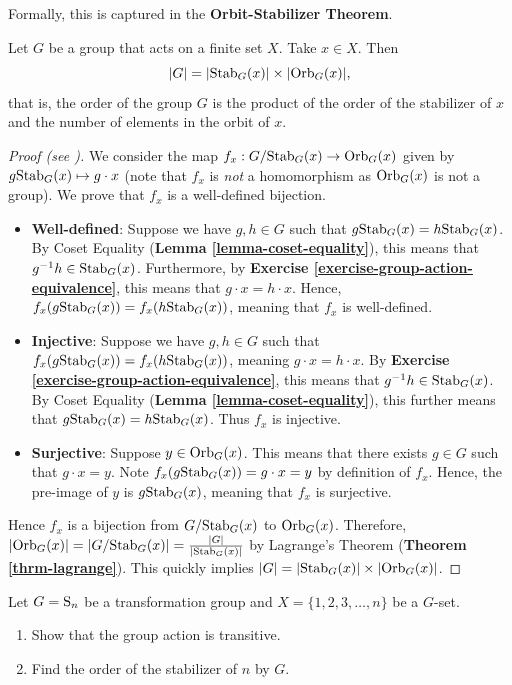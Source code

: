Formally, this is captured in the \textbf{Orbit-Stabilizer Theorem}.
\begin{theorem}\label{thrm-orbit-stabilizer}
    Let $G$ be a group that acts on a finite set $X$. Take $x \in X$. Then
    \[
        |G| = |\mathrm{Stab}_{G}(x)| \times |\mathrm{Orb}_{G}(x)|,
    \]
    that is, the order of the group $G$ is the product of the order of the stabilizer of $x$ and the number of elements in the orbit of $x$.
\end{theorem}



\begin{proof}[Proof (see \cite{humphreys_1996})]
    We consider the map $f_x: G/\mathrm{Stab}_{G}(x) \to \mathrm{Orb}_{G}(x)$ given by $g\mathrm{Stab}_{G}(x) \mapsto g \cdot x$ (note that $f_x$ is \textit{not} a homomorphism as $\mathrm{Orb}_{G}(x)$ is not a group). We prove that $f_x$ is a well-defined bijection.
    \begin{itemize}
        \item \textbf{Well-defined}: Suppose we have $g, h \in G$ such that $g\mathrm{Stab}_{G}(x) = h\mathrm{Stab}_{G}(x)$. By Coset Equality (\textbf{Lemma \ref{lemma-coset-equality}}), this means that $g^{-1}h \in \mathrm{Stab}_{G}(x)$. Furthermore, by \textbf{Exercise \ref{exercise-group-action-equivalence}}, this means that $g\cdot x = h\cdot x$. Hence, $f_x(g\mathrm{Stab}_{G}(x)) = f_x(h\mathrm{Stab}_{G}(x))$, meaning that $f_x$ is well-defined.
        \item \textbf{Injective}: Suppose we have $g, h \in G$ such that $f_x(g\mathrm{Stab}_{G}(x)) = f_x(h\mathrm{Stab}_{G}(x))$, meaning $g\cdot x = h\cdot x$. By \textbf{Exercise \ref{exercise-group-action-equivalence}}, this means that $g^{-1}h \in \mathrm{Stab}_{G}(x)$. By Coset Equality (\textbf{Lemma \ref{lemma-coset-equality}}), this further means that $g\mathrm{Stab}_{G}(x) = h\mathrm{Stab}_{G}(x)$. Thus $f_x$ is injective.
        \item \textbf{Surjective}: Suppose $y \in \mathrm{Orb}_{G}(x)$. This means that there exists $g \in G$ such that $g\cdot x = y$. Note $f_x(g\mathrm{Stab}_{G}(x)) = g\cdot x = y$ by definition of $f_x$. Hence, the pre-image of $y$ is $g\mathrm{Stab}_{G}(x)$, meaning that $f_x$ is surjective.
    \end{itemize}
    Hence $f_x$ is a bijection from $G/\mathrm{Stab}_{G}(x)$ to $\mathrm{Orb}_{G}(x)$. Therefore, $|\mathrm{Orb}_{G}(x)| = |G/\mathrm{Stab}_{G}(x)| = \frac{|G|}{|\mathrm{Stab}_{G}(x)|}$ by Lagrange's Theorem (\textbf{Theorem \ref{thrm-lagrange}}). This quickly implies $|G| = |\mathrm{Stab}_{G}(x)|\times|\mathrm{Orb}_{G}(x)|$.
\end{proof}

\begin{exercise}
    Let $G = \mathrm{S}_{n}$ be a transformation group and $X = \{1, 2, 3, \dots, n\}$ be a $G$-set.
    \begin{enumerate}[label=(\roman*)]
        \item Show that the group action is transitive.
        \item Find the order of the stabilizer of $n$ by $G$.
    \end{enumerate}
\end{exercise}



